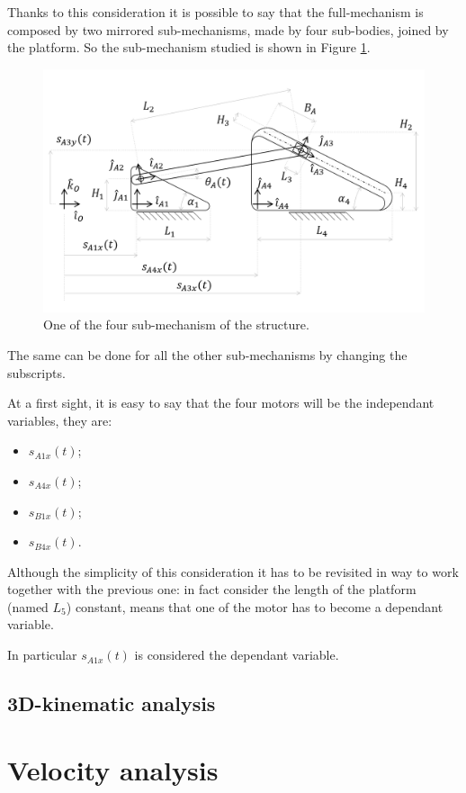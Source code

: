 \documentclass[10.5pt, twocolumn]{article}
\begin{document}
Thanks to this consideration it is possible to say that the full-mechanism is composed by two mirrored sub-mechanisms, made by four sub-bodies, joined by the platform.
So the sub-mechanism studied is shown in Figure \ref{f:Sub-Mechanism}.
\begin{figure}[h!]
	\centering
	\includegraphics[width=12cm]{Images/Sub-Mechanism}
	\caption{One of the four sub-mechanism of the structure.}
	\label{f:Sub-Mechanism}
\end{figure}
The same can be done for all the other sub-mechanisms by changing the subscripts.

At a first sight, it is easy to say that the four motors will be the independant variables, they are:
\begin{itemize}
  \item \( s_{A1x}(t) \);
  \item \( s_{A4x}(t) \);
  \item \( s_{B1x}(t) \);
  \item \( s_{B4x}(t) \).
\end{itemize}
Although the simplicity of this consideration it has to be revisited in way to work together with the previous one: in fact consider the length of the platform (named \( L_5\)) constant, means that one of the motor has to become a dependant variable.

In particular \( s_{A1x}(t) \) is considered the dependant variable.
\subsection{3D-kinematic analysis}
\label{s:3D-kinematic}

\section{Velocity analysis}
\end{document}
